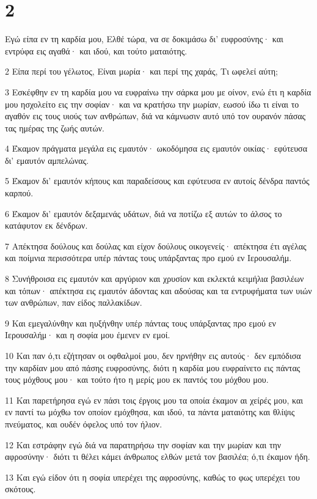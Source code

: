 \chapter{2}

\par Εγώ είπα εν τη καρδία μου, Ελθέ τώρα, να σε δοκιμάσω δι' ευφροσύνης· και εντρύφα εις αγαθά· και ιδού, και τούτο ματαιότης.
\par 2 Είπα περί του γέλωτος, Είναι μωρία· και περί της χαράς, Τι ωφελεί αύτη;
\par 3 Εσκέφθην εν τη καρδία μου να ευφραίνω την σάρκα μου με οίνον, ενώ έτι η καρδία μου ησχολείτο εις την σοφίαν· και να κρατήσω την μωρίαν, εωσού ίδω τι είναι το αγαθόν εις τους υιούς των ανθρώπων, διά να κάμνωσιν αυτό υπό τον ουρανόν πάσας τας ημέρας της ζωής αυτών.
\par 4 Έκαμον πράγματα μεγάλα εις εμαυτόν· ωκοδόμησα εις εμαυτόν οικίας· εφύτευσα δι' εμαυτόν αμπελώνας.
\par 5 Έκαμον δι' εμαυτόν κήπους και παραδείσους και εφύτευσα εν αυτοίς δένδρα παντός καρπού.
\par 6 Έκαμον δι' εμαυτόν δεξαμενάς υδάτων, διά να ποτίζω εξ αυτών το άλσος το κατάφυτον εκ δένδρων.
\par 7 Απέκτησα δούλους και δούλας και είχον δούλους οικογενείς· απέκτησα έτι αγέλας και ποίμνια περισσότερα υπέρ πάντας τους υπάρξαντας προ εμού εν Ιερουσαλήμ.
\par 8 Συνήθροισα εις εμαυτόν και αργύριον και χρυσίον και εκλεκτά κειμήλια βασιλέων και τόπων· απέκτησα εις εμαυτόν άδοντας και αδούσας και τα εντρυφήματα των υιών των ανθρώπων, παν είδος παλλακίδων.
\par 9 Και εμεγαλύνθην και ηυξήνθην υπέρ πάντας τους υπάρξαντας προ εμού εν Ιερουσαλήμ· και η σοφία μου έμενεν εν εμοί.
\par 10 Και παν ό,τι εζήτησαν οι οφθαλμοί μου, δεν ηρνήθην εις αυτούς· δεν εμπόδισα την καρδίαν μου από πάσης ευφροσύνης, διότι η καρδία μου ευφραίνετο εις πάντας τους μόχθους μου· και τούτο ήτο η μερίς μου εκ παντός του μόχθου μου.
\par 11 Και παρετήρησα εγώ εν πάσι τοις έργοις μου τα οποία έκαμον αι χείρές μου, και εν παντί τω μόχθω τον οποίον εμόχθησα, και ιδού, τα πάντα ματαιότης και θλίψις πνεύματος, και ουδέν όφελος υπό τον ήλιον.
\par 12 Και εστράφην εγώ διά να παρατηρήσω την σοφίαν και την μωρίαν και την αφροσύνην· διότι τι θέλει κάμει άνθρωπος ελθών μετά τον βασιλέα; ό,τι έκαμον ήδη.
\par 13 Και εγώ είδον ότι η σοφία υπερέχει της αφροσύνης, καθώς το φως υπερέχει του σκότους.
